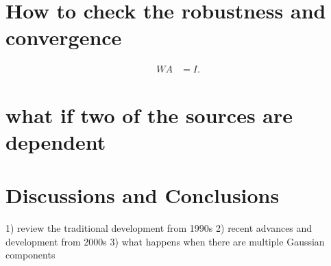 \documentclass[aps,prl,preprint,superscriptaddress]{revtex4-2}
\begin{document}
\section{How to check the robustness and convergence}

\begin{align}
W A &= I.
\end{align}



\section{what if two of the sources are dependent}

\section{Discussions and Conclusions}
1) review the traditional development from 1990s
2) recent advances and development from 2000s  
3) what happens when there are multiple Gaussian components

{}
\end{document}
